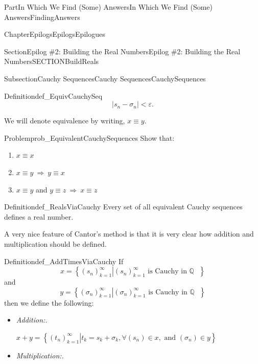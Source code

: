 \documentclass[oneside,10pt,]{book}
\newcommand{\lititle}[1]{{\slshape#1}}
\numberwithin{equation}{part}
\newcommand{\imp}{\ \Rightarrow\ }
\newcommand{\abs}[1]{\left|#1\right|}
\newcommand{\eps}{\varepsilon}
\newcommand{\QQ}{\mathbb {Q}}
\newcommand{\lt}{<}
\begin{document}
\begin{partptx}{Part}{In Which We Find (Some) Answers}{}{In Which We Find (Some) Answers}{}{}{FindingAnswers}
\begin{chapterptx}{Chapter}{Epilogs}{}{Epilogs}{}{}{Epilogues}
\begin{sectionptx}{Section}{Epilog \#2: Building the Real Numbers}{}{Epilog \#2: Building the Real Numbers}{}{}{SECTIONBuildReals}
\begin{subsectionptx}{Subsection}{Cauchy Sequences}{}{Cauchy Sequences}{}{}{CauchySequences}
\begin{definition}{Definition}{}{def_EquivCauchySeq}
\begin{equation*}
\abs{s_n-\sigma_n}\lt \eps\text{.}
\end{equation*}
%
\par
We will denote equivalence by writing, \(x\equiv y\).%
\end{definition}
\begin{problem}{Problem}{}{prob_EquivalentCauchySequences}%
Show that:%
\begin{enumerate}[font=\bfseries,label=(\alph*),ref=\alph*]%
\item{}\(x\equiv x\)%
\item{}\(x\equiv y \imp y\equiv x\)%
\item{}\(x\equiv y\) and \(y\equiv z \imp x\equiv z\)%
\end{enumerate}%
\end{problem}
\begin{definition}{Definition}{}{def_RealsViaCauchy}%
%
%
%
Every set of all equivalent Cauchy sequences defines a real number.%
\end{definition}
A very nice feature of Cantor's method is that it is very clear how addition and multiplication should be defined.%
\begin{definition}{Definition}{}{def_AddTimesViaCauchy}%
%
%
%
%
If%
\begin{equation*}
x= \left\{\left.\left(s_n\right)_{k=1}^\infty \right| \left(s_n\right)_{k=1}^\infty \text{ is Cauchy in \(\QQ\) } \right\}
\end{equation*}
and%
\begin{equation*}
y= \left\{\left.\left(\sigma_n\right)_{k=1}^\infty \right| \left(\sigma_n\right)_{k=1}^\infty \text{ is Cauchy in \(\QQ\) } \right\}
\end{equation*}
then we define the following:%
\begin{itemize}[label=\textbullet]
\item{}\lititle{Addition:.}\par%
\(\displaystyle x+y = \left\{\left.\left(t_n\right)_{k=1}^\infty \right| t_k = s_k+\sigma_k, \forall (s_n) \in x, \text{ and } (\sigma_n)\in y\right\}\)%
\item{}\lititle{Multiplication:.}\par%

\end{itemize}
\end{definition}
\end{subsectionptx}
\end{sectionptx}
\end{chapterptx}
\end{partptx}
\end{document}

